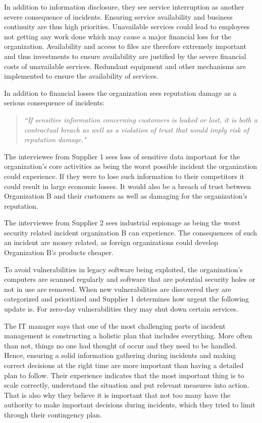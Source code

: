 In addition to information disclosure, they see service interruption as another severe consequence of incidents. Ensuring service availability and business continuity are thus high priorities. Unavailable services could lead to employees not getting any work done which may cause a major financial loss for the organization. Availability and access to files %
are therefore extremely important and thus investments to ensure availability are justified by the severe financial costs of unavailable services. Redundant equipment and other mechanisms are implemented to ensure the availability of services. 

In addition to financial losses the organization sees reputation damage as a serious consequence of incidents: 

\begin{quote}
\textit{``If sensitive information concerning customers is leaked or lost, it is both a contractual breach as well as a violation of trust that would imply risk of reputation damage."}
\end{quote}

The interviewee from Supplier 1 sees loss of sensitive data important for the organization's core activities as being the worst possible incident the organization could experience. If they were to lose such information to their competitors it could result in large economic losses. It would also be a breach of trust between Organization B and their customers as well as damaging for the organization's reputation.	

The interviewee from Supplier 2 sees industrial espionage as being the worst security related incident organization B can experience. %
The consequences of such an incident are money related, as foreign organizations could develop Organization B's products cheaper. 

To avoid vulnerabilities in legacy software being exploited, the organization's computers are scanned regularly and software that are potential security holes or not in use are removed. When new vulnerabilities are discovered they are categorized and prioritized and Supplier 1 determines how urgent the following update is. For zero-day vulnerabilities they may shut down certain services.

The IT manager says that one of the most challenging parts of incident management is constructing a holistic plan that includes everything. More often than not, things no one had thought of occur and they need to be handled. Hence, ensuring a solid information gathering during incidents and making correct decisions at the right time are more important than having a detailed plan to follow. Their experience indicates that the most important thing is to scale correctly, understand the situation and put relevant measures into action. That is also why they believe it is important that not too many have the authority to make important decisions during incidents, which they tried to limit through their contingency plan.

